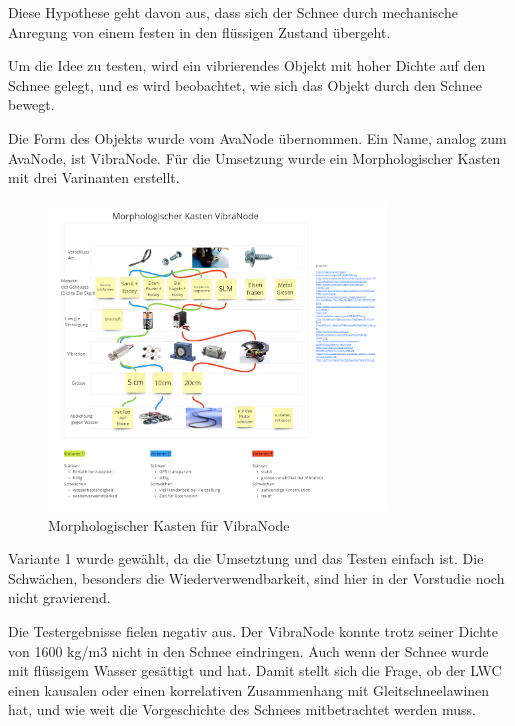
Diese Hypothese geht davon aus, dass sich der Schnee durch mechanische Anregung von einem festen in den flüssigen Zustand übergeht.

Um die Idee zu testen, wird ein vibrierendes Objekt mit hoher Dichte auf den Schnee gelegt, und es wird beobachtet, wie sich das Objekt durch den Schnee bewegt.

Die Form des Objekts wurde vom AvaNode übernommen.  Ein Name, analog zum AvaNode, ist VibraNode. Für die Umsetzung wurde ein Morphologischer Kasten mit drei Varinanten erstellt.


\begin{figure}[H]
    \centering
    \includegraphics[width=0.8\textwidth]{Bilder/Unbenann2t.PNG}
    \caption{Morphologischer Kasten für VibraNode}
    \label{fig:Bildverarbeitnugskonzpet}
\end{figure}


Variante 1 wurde gewählt, da die Umsetztung und das Testen einfach ist. Die Schwächen, besonders die Wiederverwendbarkeit, sind hier in der Vorstudie noch nicht gravierend.

Die Testergebnisse fielen negativ aus. Der VibraNode konnte trotz seiner Dichte von 1600 kg/m3 nicht in den Schnee eindringen. Auch wenn der Schnee wurde mit flüssigem Wasser gesättigt und hat.  Damit  stellt sich die Frage, ob der LWC einen kausalen oder einen korrelativen Zusammenhang mit Gleitschneelawinen hat, und wie weit die Vorgeschichte des Schnees mitbetrachtet werden muss. \cite{Altman.2015}
